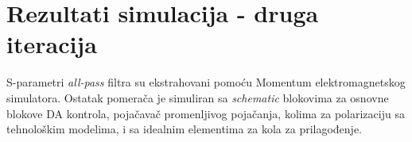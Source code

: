 \documentclass[journal,twocolumn,letterpaper]{IEEEJERM}
\begin{document}
\section{Rezultati simulacija - druga iteracija}

S-parametri \textit{all-pass} filtra su ekstrahovani pomoću Momentum elektromagnetskog simulatora. Ostatak pomerača je simuliran sa \textit{schematic} blokovima za osnovne blokove DA kontrola, pojačavač promenljivog pojačanja, kolima za polarizaciju sa tehnološkim modelima, i sa idealnim elementima za kola za prilagođenje.

   




%
%
\end{document}
